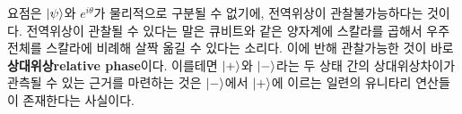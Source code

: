 \documentclass[a4paper,chapter,atbegshi]{oblivoir}
\begin{document}
요점은 $\ket{\psi}$와 $e^{i\theta}$가 물리적으로 구분될 수 없기에, 전역위상이
관찰불가능하다는 것이다. 전역위상이 관찰될 수 있다는 말은 큐비트와 같은
양자계에 스칼라를 곱해서 우주 전체를 스칼라에 비례해 살짝 옮길 수 있다는
소리다. 이에 반해 관찰가능한 것이 바로 \textbf{상대위상\tiny relative
phase}이다. 이를테면 $\ket+$와 $\ket-$라는 두 상태 간의 상대위상차이가 관측될
수 있는 근거를 마련하는 것은 $\ket-$에서 $\ket+$에 이르는 일련의 유니타리 
연산들이 존재한다는 사실이다.
\end{document}
